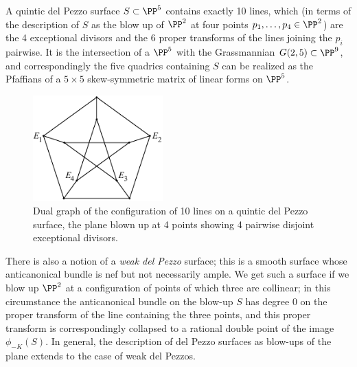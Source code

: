 %
%
%


A quintic del Pezzo surface $S \subset \PP^5$ contains exactly 10 lines, which (in terms of the description of $S$ as the blow up of $\PP^2$ at four points $p_1,\dots,p_4 \in \PP^2$) are the 4 exceptional divisors and the 6 proper transforms of the lines joining the $p_i$ pairwise. 
It is the intersection of a $\PP^5$ with the Grassmannian $G(2,5) \subset \PP^9$, and correspondingly the five quadrics containing $S$ can be realized as the Pfaffians of a  $5\times 5$ skew-symmetric matrix of linear forms on $\PP^5$.

\begin{figure}
\centerline {\includegraphics[height=1.6in]{"main/Fig11-5"}}
\caption{Dual graph of the configuration of 10 lines on a quintic del Pezzo surface, the plane blown up
at 4 points showing 4 pairwise disjoint exceptional divisors.}
\label{dual graph of the configuration of 10 lines on a quintic del Pezzo surface}
\end{figure}

There is also a notion of a \emph{weak del Pezzo} surface; this is a smooth surface whose anticanonical bundle is nef but not necessarily ample. We get such a surface if we blow up $\PP^2$ at a configuration of points of which three are collinear; in this circumstance the anticanonical bundle on the blow-up $S$ has degree 0 on the proper transform of the line containing the three points, and this proper transform is correspondingly collapsed to a rational double point of the image $\phi_{-K}(S)$. In general, the description of del Pezzo surfaces as blow-ups of the plane extends to the case of weak del Pezzos.



